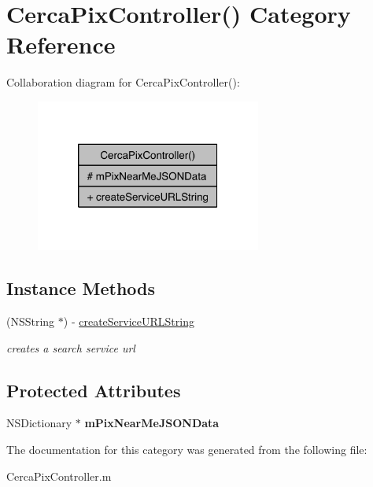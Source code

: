 \hypertarget{category_cerca_pix_controller_07_08}{\section{Cerca\-Pix\-Controller() Category Reference}
\label{category_cerca_pix_controller_07_08}
}


Collaboration diagram for Cerca\-Pix\-Controller()\-:\nopagebreak
\begin{figure}[H]
\begin{center}
\leavevmode
\includegraphics[width=210pt]{category_cerca_pix_controller_07_08__coll__graph}
\end{center}
\end{figure}
\subsection*{Instance Methods}
\begin{DoxyCompactItemize}
\item 
\hypertarget{category_cerca_pix_controller_07_08_a94c46308d3fc9bcd559e5a9c645048b8}{(N\-S\-String $\ast$) -\/ \hyperlink{category_cerca_pix_controller_07_08_a94c46308d3fc9bcd559e5a9c645048b8}{create\-Service\-U\-R\-L\-String}}\label{category_cerca_pix_controller_07_08_a94c46308d3fc9bcd559e5a9c645048b8}

\begin{DoxyCompactList}\small\item\em creates a search service url \end{DoxyCompactList}\end{DoxyCompactItemize}
\subsection*{Protected Attributes}
\begin{DoxyCompactItemize}
\item 
\hypertarget{category_cerca_pix_controller_07_08_a79f15f854a6a51c32581fb0ac996f2df}{N\-S\-Dictionary $\ast$ {\bfseries m\-Pix\-Near\-Me\-J\-S\-O\-N\-Data}}\label{category_cerca_pix_controller_07_08_a79f15f854a6a51c32581fb0ac996f2df}

\end{DoxyCompactItemize}


The documentation for this category was generated from the following file\-:\begin{DoxyCompactItemize}
\item 
Cerca\-Pix\-Controller.\-m\end{DoxyCompactItemize}
